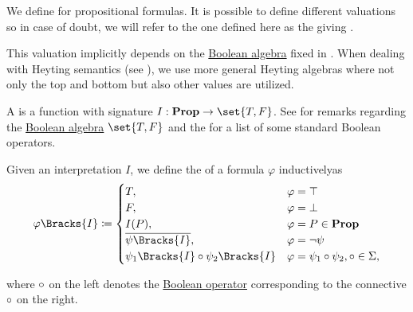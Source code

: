 \begin{definition}\label{def:propositional_valuation}
  We define  for propositional formulas. It is possible to define different valuations so in case of doubt, we will refer to the one defined here as the  giving .

  This valuation implicitly depends on the \hyperref[def:boolean_algebra]{Boolean algebra} fixed in . When dealing with Heyting semantics (see ), we use more general Heyting algebras where not only the top and bottom but also other values are utilized.

  \begin{thmenum}
     A  is a function with signature \( I: \boldop{Prop} \to \set{ T, F } \). See  for remarks regarding the \hyperref[def:boolean_algebra]{Boolean algebra} \( \set{ T, F } \) and the  for a list of some standard Boolean operators.

     Given an interpretation \( I \), we define the  of a formula \( \varphi \) inductively\IND as
    \begin{equation}\label{eq:def:propositional_valuation/formula_interpretation}
      \varphi\Bracks{I} \coloneqq \begin{cases}
        T,                                         &\varphi = \top \\
        F,                                         &\varphi = \bot \\
        I(P),                                      &\varphi = P \in \boldop{Prop} \\
        \overline{\psi\Bracks{I}},                 &\varphi = \neg \psi \\
        \psi_1\Bracks{I} \bincirc \psi_2\Bracks{I} &\varphi = \psi_1 \bincirc \psi_2, \bincirc \in \Sigma,
      \end{cases}
    \end{equation}
  \end{thmenum}
  where \( \mathbin \circ \) on the left denotes the \hyperref[def:standard_boolean_operators]{Boolean operator} corresponding to the connective \( \mathbin \circ \) on the right.
\end{definition}

